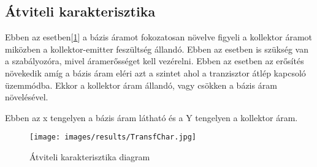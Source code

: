 \subsection{Átviteli karakterisztika}

Ebben az esetben[\ref{fig:transfChar}]  a bázis áramot fokozatosan növelve figyeli a kollektor
áramot miközben a kollektor-emitter feszültség állandó.
Ebben az esetben is szükség van a szabályozóra, mivel áramerősséget kell
vezérelni. Ebben az esetben az erősítés növekedik amíg a bázis
áram eléri azt a szintet ahol a tranzisztor átlép kapcsoló
üzemmódba. Ekkor a kollektor áram állandó, vagy csökken a bázis áram
növelésével.

Ebben az x tengelyen a bázis áram látható és a Y tengelyen a kollektor áram.

\begin{figure}[H]
    \centering
    \texttt{[image: images/results/TransfChar.jpg]}
    \caption{Átviteli karakterisztika diagram}
    \label{fig:transfChar}
\end{figure}



